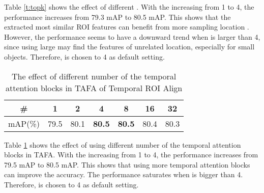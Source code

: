 \documentclass[letterpaper]{article} \usepackage{aaai21}  \usepackage{times}  \usepackage{helvet} \usepackage{courier}  \usepackage[hyphens]{url}  \usepackage{graphicx} \usepackage{hyperref}
\begin{document}
Table \ref{t:topk} shows the effect of different . With the  increasing from 1 to 4, the performance increases from 79.3 mAP to 80.5 mAP. This shows that the extracted most similar ROI features can benefit from more sampling location . However, the performance seems to have a downward trend when  is larger than 4, since using large  may find the features of unrelated location, especially for small objects.
Therefore,  is chosen to 4 as default setting.

\begin{table}[t]
\begin{center}
\begin{tabular}{c|c|c|c|c|c|c}
  \hline
  \hline
  \# & 1 & 2 & 4 & 8 & 16 & 32\\
  \hline
  mAP(\%) &79.5 & 80.1 & \textbf{80.5}& \textbf{80.5} & 80.4 & 80.3\\
  \hline
  \hline
\end{tabular}
\end{center}
\vspace{-0.2cm}
\caption{The effect of different number of the temporal attention blocks  in TAFA of Temporal ROI Align}
\label{t:attention_maps}
\vspace{-0.2cm}
\end{table}
Table \ref{t:attention_maps} shows the effect of using different number of the temporal attention blocks  in TAFA. With the  increasing from 1 to 4, the performance increases from 79.5 mAP to 80.5 mAP. This shows that using more temporal attention blocks can improve the accuracy. The performance saturates when  is bigger than 4. Therefore,  is chosen to 4 as default setting.
\end{document}
